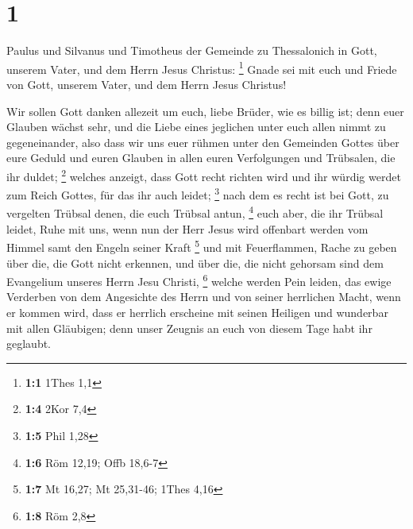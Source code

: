 \hypertarget{section}{%
\section{1}\label{section}}

 Paulus und Silvanus und Timotheus der Gemeinde zu
Thessalonich in Gott, unserem Vater, und dem Herrn Jesus Christus:
\footnote{\textbf{1:1} 1Thes 1,1}  Gnade sei mit euch und
Friede von Gott, unserem Vater, und dem Herrn Jesus Christus!

 Wir sollen Gott danken allezeit um euch, liebe Brüder,
wie es billig ist; denn euer Glauben wächst sehr, und die Liebe eines
jeglichen unter euch allen nimmt zu gegeneinander,  also
dass wir uns euer rühmen unter den Gemeinden Gottes über eure Geduld und
euren Glauben in allen euren Verfolgungen und Trübsalen, die ihr duldet;
\footnote{\textbf{1:4} 2Kor 7,4}  welches anzeigt, dass
Gott recht richten wird und ihr würdig werdet zum Reich Gottes, für das
ihr auch leidet; \footnote{\textbf{1:5} Phil 1,28}  nach
dem es recht ist bei Gott, zu vergelten Trübsal denen, die euch Trübsal
antun, \footnote{\textbf{1:6} Röm 12,19; Offb 18,6-7} 
euch aber, die ihr Trübsal leidet, Ruhe mit uns, wenn nun der Herr Jesus
wird offenbart werden vom Himmel samt den Engeln seiner Kraft
\footnote{\textbf{1:7} Mt 16,27; Mt 25,31-46; 1Thes 4,16} 
und mit Feuerflammen, Rache zu geben über die, die Gott nicht erkennen,
und über die, die nicht gehorsam sind dem Evangelium unseres Herrn Jesu
Christi, \footnote{\textbf{1:8} Röm 2,8}  welche werden
Pein leiden, das ewige Verderben von dem Angesichte des Herrn und von
seiner herrlichen Macht,  wenn er kommen wird, dass er
herrlich erscheine mit seinen Heiligen und wunderbar mit allen
Gläubigen; denn unser Zeugnis an euch von diesem Tage habt ihr geglaubt.

